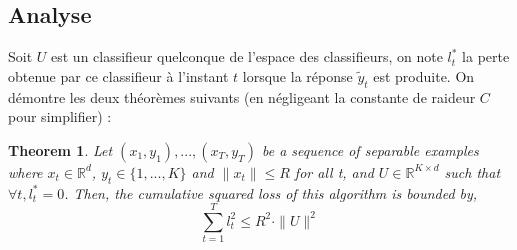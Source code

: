 \documentclass[preprint,12pt,authoryear]{elsarticle}
\newtheorem{theorem}{Theorem}
\begin{document}
\subsection{Analyse}
Soit $U$ est un classifieur quelconque de l'espace des classifieurs, on note $l_t^{\ast}$ la perte obtenue par ce classifieur à l'instant $t$ lorsque la réponse $\tilde{y}_t$ est produite. On démontre les deux théorèmes suivants (en négligeant la constante de raideur $C$ pour simplifier) :

\begin{theorem}
	\label{theo:BPAT1}
	Let $(x_1,y_1),...,(x_T,y_T)$ be a sequence of separable examples where $x_t \in \mathbb{R}^d$, $y_t\in \{1,...,K\}$ and $\parallel x_t \parallel\leqslant R$ for all t, and $U \in \mathbb{R}^{K\times d}$ such that $ \forall t, l^*_t=0$. Then, the cumulative squared loss of this algorithm is bounded by,
	\begin{equation}
	\sum_{t=1}^{T} l_t^2 \leqslant R^2\cdot \parallel{U}\parallel^2
	\end{equation}
\end{theorem}
\end{document}
